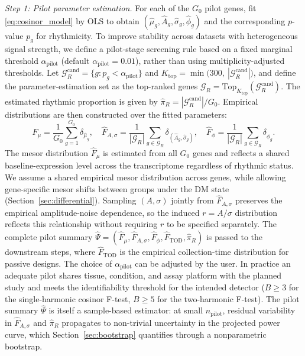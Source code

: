 \documentclass{article}
\begin{document}
\emph{Step 1: Pilot parameter estimation.}
For each of the $G_0$ pilot genes, fit \eqref{eq:cosinor_model} by OLS to obtain
$(\hat{\mu}_g, \hat{A}_g, \hat{\sigma}_g, \hat{\phi}_g)$ and the corresponding
$p$-value $p_g$ for rhythmicity. To improve stability across datasets with
heterogeneous signal strength, we define a pilot-stage screening rule based on
a fixed marginal threshold $\alpha_{\text{pilot}}$ (default $\alpha_{\text{pilot}}=0.01$),
rather than using multiplicity-adjusted thresholds. Let
$\mathcal{G}_R^{\mathrm{cand}} = \{g : p_g < \alpha_{\text{pilot}}\}$ and
$K_{\mathrm{top}} = \min\bigl(300,\ |\mathcal{G}_R^{\mathrm{cand}}|\bigr)$, and
define the parameter-estimation set as the top-ranked genes
$\mathcal{G}_R = \mathrm{Top}_{K_{\mathrm{top}}}(\mathcal{G}_R^{\mathrm{cand}})$.
The estimated rhythmic proportion is given by
$\hat{\pi}_R = |\mathcal{G}_R^{\mathrm{cand}}| / G_0$.
Empirical distributions are then constructed over the fitted parameters:
\begin{equation}
\hat{F}_\mu
=
\frac{1}{G_0}\sum_{g=1}^{G_0}\delta_{\hat{\mu}_g},
\quad
\hat{F}_{A,\sigma}
=
\frac{1}{|\mathcal{G}_R|}\sum_{g\in\mathcal{G}_R}\delta_{(\hat{A}_g,\hat{\sigma}_g)},
\quad
\hat{F}_{\phi}
=
\frac{1}{|\mathcal{G}_R|}\sum_{g\in\mathcal{G}_R}\delta_{\hat{\phi}_g}.
\label{eq:empirical_dists}
\end{equation}
The mesor distribution $\hat{F}_\mu$ is estimated from all $G_0$ genes and reflects a
shared baseline-expression level across the transcriptome regardless of rhythmic status.
We assume a shared empirical mesor distribution across genes, while allowing
gene-specific mesor shifts between groups under the DM state
(Section~\ref{sec:differential}).
Sampling $(A,\sigma)$ jointly from $\hat{F}_{A,\sigma}$ preserves the empirical
amplitude-noise dependence, so the induced
$r=A/\sigma$ distribution reflects this relationship without requiring $r$ to be specified separately.
The complete pilot summary $\hat{\Psi} = (\hat{F}_\mu, \hat{F}_{A,\sigma},
\hat{F}_\phi, \hat{F}_{\mathrm{TOD}}, \hat{\pi}_R)$ is passed to the downstream
steps, where $\hat{F}_{\mathrm{TOD}}$ is the empirical collection-time
distribution for passive designs. The choice of $\alpha_{\text{pilot}}$ can be
adjusted by the user. In practice an adequate pilot shares tissue,
condition, and assay platform with the planned study and meets the
identifiability threshold for the intended detector ($B \geq 3$ for
the single-harmonic cosinor F-test, $B \geq 5$ for the two-harmonic F-test). The pilot summary
$\hat{\Psi}$ is itself a sample-based estimator: at small
$n_{\mathrm{pilot}}$, residual variability in $\hat{F}_{A,\sigma}$ and
$\hat{\pi}_R$ propagates to non-trivial uncertainty in the projected
power curve, which Section~\ref{sec:bootstrap} quantifies through a
nonparametric bootstrap.
\end{document}
